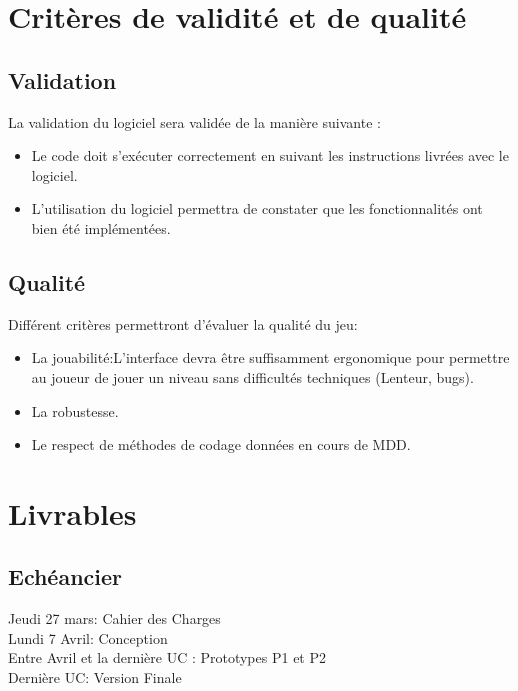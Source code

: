 \documentclass[a4paper,11pt]{article}
\begin{document}
\section{Critères de validité et de qualité}
\label{sec:crit_re_de_validit_et_de_qualit_}
\subsection{Validation}
\label{sub:validation}

La validation du logiciel sera validée de la manière suivante :\\
\begin{itemize}[label = $\bullet$]
	\item Le code doit s’exécuter correctement en suivant les instructions livrées avec le logiciel.
	\item L'utilisation du logiciel permettra de constater que les fonctionnalités ont bien été implémentées.
\end{itemize}

\subsection{Qualité}
\label{sub:qualit_}

Différent critères permettront d'évaluer la qualité du jeu:\\
\begin{itemize}[label = $\bullet$]
	\item La jouabilité:L'interface devra être suffisamment ergonomique pour permettre au joueur de jouer un niveau sans difficultés techniques (Lenteur, bugs).
	\item La robustesse.
	\item Le respect de méthodes de codage données en cours de MDD.
\end{itemize}

\section{Livrables} 

\subsection{Echéancier}

\noindent
Jeudi 27 mars: Cahier des Charges \\
Lundi 7 Avril: Conception \\
Entre Avril et la dernière UC : Prototypes P1 et P2\\
Dernière UC: Version Finale \\ \\
\end{document}
